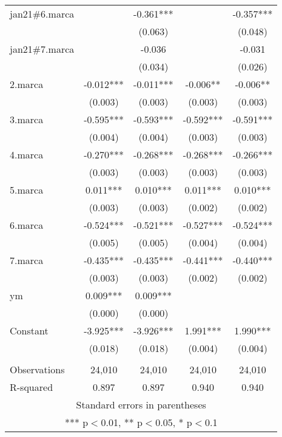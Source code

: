 \begin{longtable}{lcccc}
jan21\#6.marca &  & -0.361*** &  & -0.357*** \\
 &  & (0.063) &  & (0.048) \\
jan21\#7.marca &  & -0.036 &  & -0.031 \\
 &  & (0.034) &  & (0.026) \\
2.marca & -0.012*** & -0.011*** & -0.006** & -0.006** \\
& (0.003) & (0.003) & (0.003) & (0.003) \\
3.marca & -0.595*** & -0.593*** & -0.592*** & -0.591*** \\
& (0.004) & (0.004) & (0.003) & (0.003) \\
4.marca & -0.270*** & -0.268*** & -0.268*** & -0.266*** \\
& (0.003) & (0.003) & (0.003) & (0.003) \\
5.marca & 0.011*** & 0.010*** & 0.011*** & 0.010*** \\
& (0.003) & (0.003) & (0.002) & (0.002) \\
6.marca & -0.524*** & -0.521*** & -0.527*** & -0.524*** \\
& (0.005) & (0.005) & (0.004) & (0.004) \\
7.marca & -0.435*** & -0.435*** & -0.441*** & -0.440*** \\
& (0.003) & (0.003) & (0.002) & (0.002) \\
ym & 0.009*** & 0.009*** &  &  \\
 & (0.000) & (0.000) &  &  \\
Constant & -3.925*** & -3.926*** & 1.991*** & 1.990*** \\
 & (0.018) & (0.018) & (0.004) & (0.004) \\
 &  &  &  &  \\
Observations & 24,010 & 24,010 & 24,010 & 24,010 \\
 R-squared & 0.897 & 0.897 & 0.940 & 0.940 \\ \hline
\multicolumn{5}{c}{ Standard errors in parentheses} \\
\multicolumn{5}{c}{ *** p$<$0.01, ** p$<$0.05, * p$<$0.1} \\
\end{longtable}

